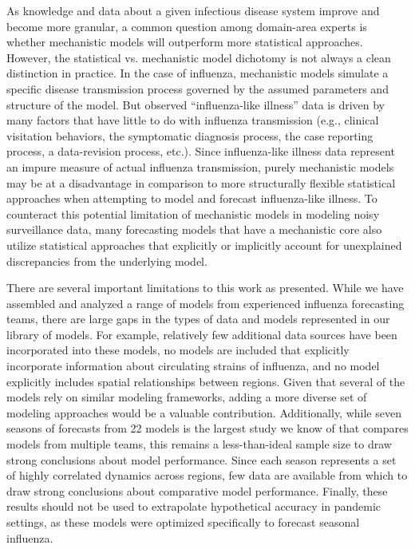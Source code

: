 \documentclass[9pt,twocolumn,twoside]{pnas-new}\usepackage[]{graphicx}\usepackage[]{color}
\begin{document}
As knowledge and data about a given infectious disease system improve and become more granular, a common question among domain-area experts is whether mechanistic models will outperform more statistical approaches.
However, the statistical vs. mechanistic model dichotomy is not always a clean distinction in practice.
In the case of influenza, mechanistic models simulate a specific disease transmission process governed by the assumed parameters and structure of the model. 
But observed ``influenza-like illness'' data is driven by many factors that have little to do with influenza transmission (e.g., clinical visitation behaviors, the symptomatic diagnosis process, the case reporting process, a data-revision process, etc.). 
Since influenza-like illness data represent an impure measure of actual influenza transmission, purely mechanistic models may be at a disadvantage in comparison to more structurally flexible statistical approaches when attempting to model and forecast influenza-like illness.
To counteract this potential limitation of mechanistic models in modeling noisy surveillance data, many forecasting models that have a mechanistic core also utilize statistical approaches that explicitly or implicitly account for unexplained discrepancies from the underlying model.\cite{Pei2017,osthus2018dynamic}

There are several important limitations to this work as presented.
While we have assembled and analyzed a range of models from experienced influenza forecasting teams, there are large gaps in the types of data and models represented in our library of models.
For example, relatively few additional data sources have been incorporated into these models, no models are included that explicitly incorporate information about circulating strains of influenza, and no model explicitly includes spatial relationships between regions.
Given that several of the models rely on similar modeling frameworks, adding a more diverse set of modeling approaches would be a valuable contribution.
Additionally, while seven seasons of forecasts from 22 models is the largest study we know of that compares models from multiple teams, this remains a less-than-ideal sample size to draw strong conclusions about model performance. 
Since each season represents a set of highly correlated dynamics across regions, few data are available from which to draw strong conclusions about comparative model performance.
Finally, these results should not be used to extrapolate hypothetical accuracy in pandemic settings, as these models were optimized specifically to forecast seasonal influenza.
\end{document}

